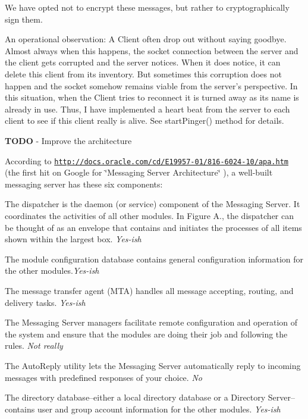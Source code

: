 We have opted not to encrypt these messages, but rather to cryptographically sign them. 

An operational observation\-: A Client often drop out without saying goodbye. Almost always when this happens, the socket connection between the server and the client gets corrupted and the server notices. When it does notice, it can delete this client from its inventory. But sometimes this corruption does not happen and the socket somehow remains viable from the server's perspective. In this situation, when the Client tries to reconnect it is turned away as its name is already in use. Thus, I have implemented a heart beat from the server to each client to see if this client really is alive. See start\-Pinger() method for details. 

{\bfseries T\-O\-D\-O} -\/ Improve the architecture 

According to \href{http://docs.oracle.com/cd/E19957-01/816-6024-10/apa.htm}{\tt http\-://docs.\-oracle.\-com/cd/\-E19957-\/01/816-\/6024-\/10/apa.\-htm} (the first hit on Google for \char`\"{}\-Messaging Server Architecture\char`\"{} ), a well-\/built messaging server has these six components\-: 
\begin{DoxyItemize}
\item The dispatcher is the daemon (or service) component of the Messaging Server. It coordinates the activities of all other modules. In Figure A., the dispatcher can be thought of as an envelope that contains and initiates the processes of all items shown within the largest box. {\itshape Yes-\/ish} 
\item The module configuration database contains general configuration information for the other modules.{\itshape Yes-\/ish} 
\item The message transfer agent (M\-T\-A) handles all message accepting, routing, and delivery tasks. {\itshape Yes-\/ish} 
\item The Messaging Server managers facilitate remote configuration and operation of the system and ensure that the modules are doing their job and following the rules. {\itshape Not really} 
\item The Auto\-Reply utility lets the Messaging Server automatically reply to incoming messages with predefined responses of your choice. {\itshape No} 
\item The directory database--either a local directory database or a Directory Server--contains user and group account information for the other modules. {\itshape Yes-\/ish} 
\end{DoxyItemize}

